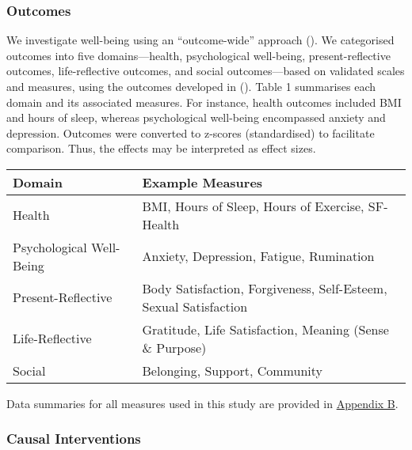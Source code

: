 \documentclass[
  single column]{article}
\begin{document}
\subsubsection{Outcomes}\label{outcomes}

We investigate well-being using an ``outcome-wide'' approach
(). We
categorised outcomes into five domains---health, psychological
well-being, present-reflective outcomes, life-reflective outcomes, and
social outcomes---based on validated scales and measures, using the
outcomes developed in (). Table 1 summarises each domain and its associated measures.
For instance, health outcomes included BMI and hours of sleep, whereas
psychological well-being encompassed anxiety and depression. Outcomes
were converted to z-scores (standardised) to facilitate comparison.
Thus, the effects may be interpreted as effect sizes.

\begin{longtable}[]{@{}
  >{\raggedright\arraybackslash}p{}
  >{\raggedright\arraybackslash}p{}@{}}
\toprule\noalign{}
\begin{minipage}[b]{\linewidth}\raggedright
Domain
\end{minipage} & \begin{minipage}[b]{\linewidth}\raggedright
Example Measures
\end{minipage} \\
\midrule\noalign{}
\endhead
\bottomrule\noalign{}
\endlastfoot
Health & BMI, Hours of Sleep, Hours of Exercise, SF-Health \\
Psychological Well-Being & Anxiety, Depression, Fatigue, Rumination \\
Present-Reflective & Body Satisfaction, Forgiveness, Self-Esteem, Sexual
Satisfaction \\
Life-Reflective & Gratitude, Life Satisfaction, Meaning (Sense \&
Purpose) \\
Social & Belonging, Support, Community \\
\end{longtable}

Data summaries for all measures used in this study are provided in
\hyperref[appendix-baseline]{Appendix B}.

\subsubsection{Causal Interventions}\label{causal-interventions}
\end{document}
